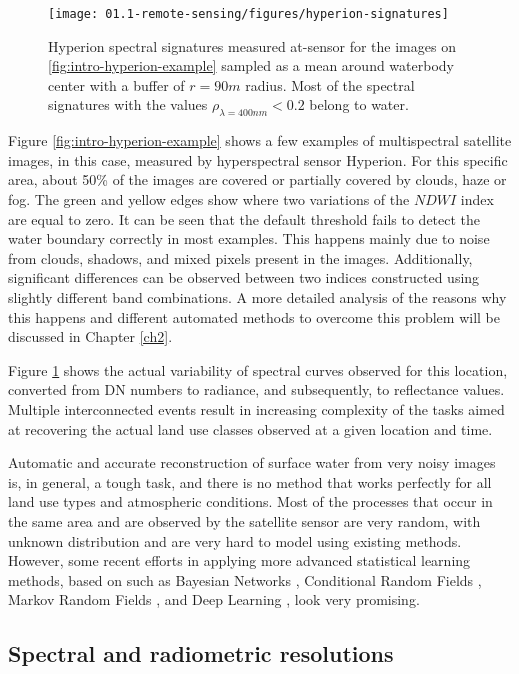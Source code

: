 \begin{figure}
	\texttt{[image: 01.1-remote-sensing/figures/hyperion-signatures]}
	\caption{Hyperion spectral signatures measured at-sensor for the images on \ref{fig:intro-hyperion-example} sampled as a mean around waterbody center with a buffer of $r=90m$ radius. Most of the spectral signatures with the values $\rho_{\lambda = 400nm} < 0.2$ belong to water.} 
	\label{fig:intro-hyperion-example-signatures}
\end{figure}

Figure \ref{fig:intro-hyperion-example} shows a few examples of multispectral satellite images, in this case, measured by hyperspectral sensor Hyperion. For this specific area, about 50\% of the images are covered or partially covered by clouds, haze or fog. The green and yellow edges show where two variations of the $NDWI$ index are equal to zero. It can be seen that the default threshold fails to detect the water boundary correctly in most examples. This happens mainly due to noise from clouds, shadows, and mixed pixels present in the images. Additionally, significant differences can be observed between two indices constructed using slightly different band combinations. A more detailed analysis of the reasons why this happens and different automated methods to overcome this problem will be discussed in Chapter \ref{ch2}.

Figure \ref{fig:intro-hyperion-example-signatures} shows the actual variability of spectral curves observed for this location, converted from DN numbers to radiance, and subsequently, to reflectance values. Multiple interconnected events result in increasing complexity of the tasks aimed at recovering the actual land use classes observed at a given location and time.

Automatic and accurate reconstruction of surface water from very noisy images is, in general, a tough task, and there is no method that works perfectly for all land use types and atmospheric conditions. Most of the processes that occur in the same area and are observed by the satellite sensor are very random, with unknown distribution and are very hard to model using existing methods. However, some recent efforts in applying more advanced statistical learning methods, based on such as Bayesian Networks \citet{mello2013bayesian}, Conditional Random Fields \citet{hoberg2015conditional}, Markov Random Fields \citet{elmi2016dynamic}, and Deep Learning \citet{chen2014deep}, look very promising.

\subsection{Spectral and radiometric resolutions}


